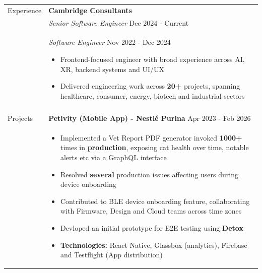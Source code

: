 \documentclass[11pt]{article}
\begin{document}
\begin{minipage}[t][0pt]{\linewidth}
\begin{tabular}[t]{p{2cm} p{14cm}}
	               \\

	               {Experience}        &
	               \textbf{Cambridge Consultants}                                                                                                                                                                                                      \\ &

	               \textit{Senior Software Engineer} \hfill Dec 2024 - Current
	               \\ &
	               \textit{Software Engineer} \hfill Nov 2022 - Dec 2024
	               \begin{itemize}
		               \renewcommand{\labelitemi}{$\diamond$}
		               \item Frontend-focused engineer with broad experience across AI, XR, backend systems and UI/UX
		               \item Delivered engineering work across \textbf{20+} projects, spanning healthcare, consumer, energy, biotech and industrial sectors
	               \end{itemize}                                                                                \\ &


	               \\
	               {Projects}          &
	               \textbf{Petivity (Mobile App) - Nestlé Purina}  \hfill Apr 2023 - Feb 2026                                                                                                                                                          \\ &
	               \begin{itemize}
		               \renewcommand{\labelitemi}{$\diamond$}
		               \item Implemented a Vet Report PDF generator invoked \textbf{1000+} times in \textbf{production}, exposing cat health over time, notable alerts etc via a GraphQL interface
		               \item Resolved \textbf{several} production issues affecting users during device onboarding
		               \item Contributed to BLE device onboarding feature, collaborating with Firmware, Design and Cloud teams across time zones
		               \item Devloped an initial prototype for E2E testing using \textbf{Detox}
		               \item \textbf{Technologies:} React Native, Glassbox (analytics), Firebase and Testflight (App distribution)


\end{itemize}
\end{tabular}
\end{minipage}
\end{document}
